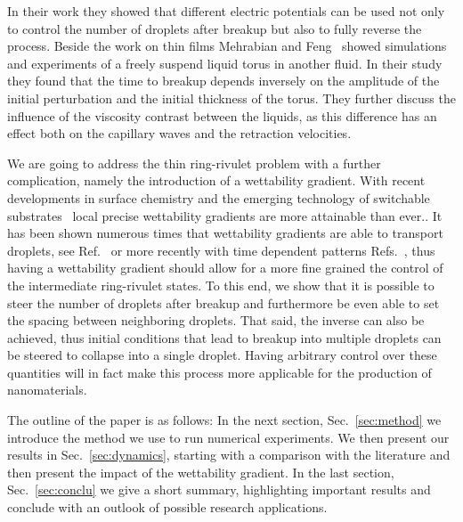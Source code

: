 \documentclass[twoside,twocolumn,9pt]{article}
\begin{document}
In their work they showed that different electric potentials can be used not only to control the number of droplets after breakup but also to fully reverse the process.
Beside the work on thin films Mehrabian and Feng~\cite{mehrabianCapillaryBreakupLiquid2013} showed simulations and experiments of a freely suspend liquid torus in another fluid.
In their study they found that the time to breakup depends inversely on the amplitude of the initial perturbation and the initial thickness of the torus.
They further discuss the influence of the viscosity contrast between the liquids, as this difference has an effect both on the capillary waves and the retraction velocities.
 

We are going to address the thin ring-rivulet problem with a further complication, namely the introduction of a wettability gradient.
With recent developments in surface chemistry and the emerging technology of switchable substrates~\cite{xinReversiblySwitchableWettability2010, stuartEmergingApplicationsStimuliresponsive2010,chenThermalresponsiveHydrogelSurface2010, ichimuraLightDrivenMotionLiquids2000, mugeleElectrowettingConvenientWay2005, edwardsControllingBreakupToroidal2021} local precise wettability gradients are more attainable than ever..
It has been shown numerous times that wettability gradients are able to transport droplets, see Ref.~\cite{liuActuatingWaterDroplets2015} or more recently with time dependent patterns Refs.~\cite{grawitterSteeringDropletsSubstrates2021, zitzControllingDewettingMorphologies2023}, thus having a wettability gradient should allow for a more fine grained the control of the intermediate ring-rivulet states.
To this end, we show that it is possible to steer the number of droplets after breakup and furthermore be even able to set the spacing between neighboring droplets.
That said, the inverse can also be achieved, thus initial conditions that lead to breakup into multiple droplets can be steered to collapse into a single droplet. 
Having arbitrary control over these quantities will in fact make this process more applicable for the production of nanomaterials. 

The outline of the paper is as follows: In the next section, Sec.~\ref{sec:method} we introduce the method we use to run numerical experiments.
We then present our results in Sec.~\ref{sec:dynamics}, starting with a comparison with the literature and then present the impact of the wettability gradient.
In the last section, Sec.~\ref{sec:conclu} we give a short summary, highlighting important results and conclude with an outlook of possible research applications.
\end{document}
